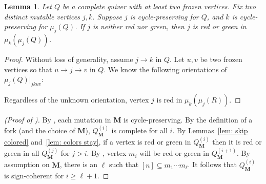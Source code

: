 \documentclass[12pt]{amsart}
\newtheorem{lem}[thm]{Lemma}
\theoremstyle{definition}
\theoremstyle{remark}
\numberwithin{equation}{section}
\begin{document}
\begin{lem}
\label{lem:mutation makes more color}
Let $Q$ be a complete quiver with at least two frozen vertices.
Fix two distinct mutable vertices $j,k$.
Suppose $j$ is cycle-preserving for $Q$, and $k$ is cycle-preserving for $\mu_j(Q)$.
If $j$ is neither red nor green, then $j$ is red or green in $\mu_k(\mu_j(Q))$.
\end{lem}

\begin{proof}
Without loss of generality, assume $j \rightarrow k$ in $Q$.
Let $u,v$ be two frozen vertices so that $u \rightarrow j \rightarrow v$ in $Q$. 
We know the following orientations of $\mu_j(Q)|_{jkuv}$: 

\centering
{}

Regardless of the unknown orientation, vertex $j$ is red in $\mu_k(\mu_j(R))$.
\end{proof}

\begin{proof}[{(Proof of )}]
By , each mutation in $\mathbf M$ is cycle-preserving.
By the definition of a fork (and the choice of $\mathbf M$), $Q_{\mathbf M}^{(i)}$ is complete for all $i$.
By Lemmas~\ref{lem: skip colored} and~\ref{lem: colors stay}, if a vertex is red or green in $Q_{\mathbf M}^{(i)}$ then it is red or green in all $Q_{\mathbf M}^{(j)}$ for $j>i$. 
By , vertex $m_i$ will be red or green in $Q_{\mathbf M}^{(i+1)}$. 
By assumption on $\mathbf M$, there is an $\ell$ such that $[n]\subseteq m_1\cdots m_{\ell}$.
It follows that $Q_{\mathbf M}^{(i)}$ is sign-coherent for $i \geq \ell+1$.
\end{proof}
\end{document}
